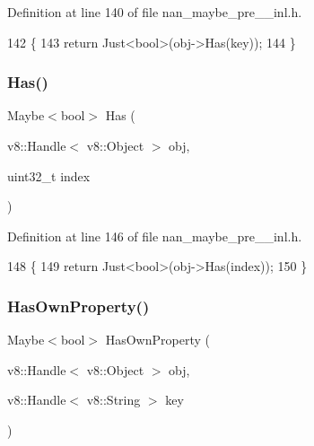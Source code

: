 Definition at line 140 of file nan\+\_\+maybe\+\_\+pre\+\_\+\_\+inl.\+h.


\begin{DoxyCode}
142                             \{
143   \textcolor{keywordflow}{return} Just<bool>(obj->Has(key));
144 \}
\end{DoxyCode}
\mbox{\label{nan__maybe__pre__43__inl_8h_ab2ea293dd877175a2f3408d5a14310b1}} 
\subsubsection{Has()\hspace{0.1cm}{\footnotesize\ttfamily [2/2]}}
{\footnotesize\ttfamily Maybe$<$bool$>$ Has (\begin{DoxyParamCaption}\item[{v8\+::\+Handle$<$ v8\+::\+Object $>$}]{obj,  }\item[{uint32\+\_\+t}]{index }\end{DoxyParamCaption})}



Definition at line 146 of file nan\+\_\+maybe\+\_\+pre\+\_\+\_\+inl.\+h.


\begin{DoxyCode}
148                     \{
149   \textcolor{keywordflow}{return} Just<bool>(obj->Has(index));
150 \}
\end{DoxyCode}
\mbox{\label{nan__maybe__pre__43__inl_8h_a40e88849399ba58bc913343cda0c5e38}} 
\subsubsection{Has\+Own\+Property()}
{\footnotesize\ttfamily Maybe$<$bool$>$ Has\+Own\+Property (\begin{DoxyParamCaption}\item[{v8\+::\+Handle$<$ v8\+::\+Object $>$}]{obj,  }\item[{v8\+::\+Handle$<$ v8\+::\+String $>$}]{key }\end{DoxyParamCaption})}



